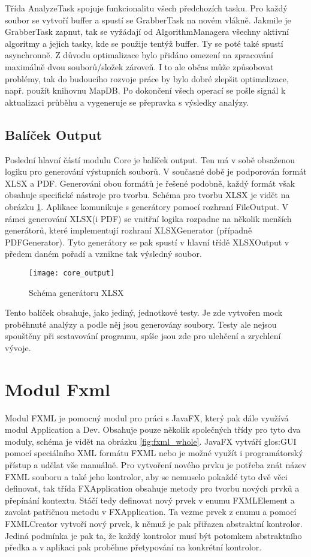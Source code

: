 Třída AnalyzeTask spojuje funkcionalitu všech předchozích tasku. Pro každý soubor se vytvoří buffer a spustí se GrabberTask na novém vlákně. Jakmile je GrabberTask zapnut, tak se vyžádají od AlgorithmManagera všechny aktivní algoritmy a jejich tasky, kde se použije tentýž buffer. Ty se poté také spustí asynchronně. Z důvodu optimalizace bylo přidáno omezení na zpracování maximálně dvou souborů/složek zároveň. I to ale občas může způsobovat problémy, tak do budoucího rozvoje práce by bylo dobré zlepšit optimalizace, např. použít knihovnu MapDB. Po dokončení všech operací se pošle signál k aktualizaci průběhu a vygeneruje se přepravka s výsledky analýzy.

\subsection{Balíček Output}
Poslední hlavní částí modulu Core je balíček output. Ten má v sobě obsaženou logiku pro generování výstupních souborů. V současné době je podporován formát XLSX a PDF. Generováni obou formátů je řešené podobně, každý formát však obsahuje specifické nástroje pro tvorbu. Schéma pro tvorbu XLSX je vidět na obrázku \ref{fig:core_output}. Aplikace komunikuje s generátory pomocí rozhraní FileOutput. V rámci generování XLSX(i PDF) se vnitřní logika rozpadne na několik menších generátorů, které implementují rozhraní XLSXGenerator (případně PDFGenerator). Tyto generátory se pak spustí v hlavní třídě XLSXOutput v předem daném pořadí a vznikne tak výsledný soubor.

\begin{figure}[h]
	\texttt{[image: core\_output]}
	\centering
	\caption{Schéma generátoru XLSX \label{fig:core_output}}
\end{figure} 
\FloatBarrier

Tento balíček obsahuje, jako jediný, jednotkové testy. Je zde vytvořen mock proběhnuté analýzy a podle něj jsou generovány soubory. Testy ale nejsou spouštěny při sestavování programu, spíše jsou zde pro ulehčení a zrychlení vývoje.


\section{Modul Fxml}
Modul FXML je pomocný modul pro práci s JavaFX, který pak dále využívá modul Application a Dev. Obsahuje pouze několik společných třídy pro tyto dva moduly, schéma je vidět na obrázku \ref{fig:fxml_whole}. JavaFX vytváří \gls{glos:GUI} pomocí speciálního XML formátu FXML nebo je možné využít i programátorský přístup a udělat vše manuálně. Pro vytvoření nového prvku je potřeba znát název FXML souboru a také jeho kontrolor, aby se nemuselo pokaždé tyto dvě věci definovat, tak třída FXApplication obsahuje metody pro tvorbu nových prvků a přepínání kontextu. Stáčí tedy definovat nový prvek v enumu FXMLElement a zavolat patřičnou metodu v FXApplication. Ta vezme prvek z enumu a pomocí FXMLCreator vytvoří nový prvek, k němuž je pak přiřazen abstraktní kontrolor. Jediná podmínka je pak ta, že každý kontrolor musí být potomkem abstraktního předka a v aplikaci pak proběhne přetypování na konkrétní kontrolor.

